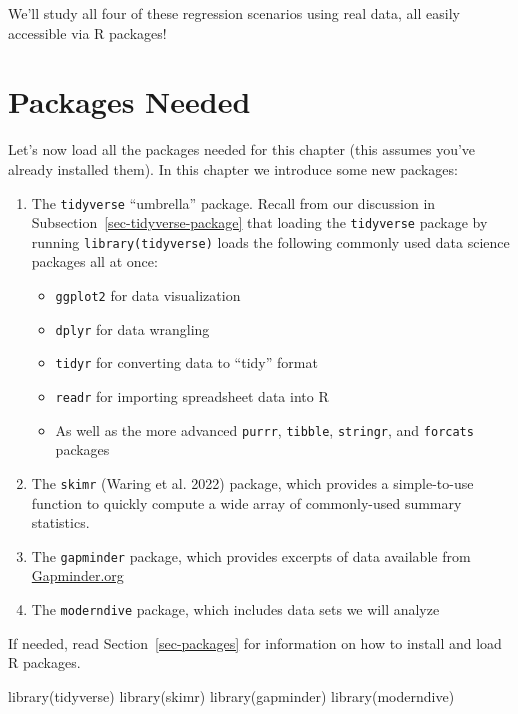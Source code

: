 \documentclass[
  letterpaper,
  DIV=11,
  numbers=noendperiod]{scrreprt}
\newenvironment{Shaded}{\begin{snugshade}}{\end{snugshade}}
\newcommand{\FunctionTok}[1]{\textcolor[rgb]{0.28,0.35,0.67}{#1}}
\newcommand{\NormalTok}[1]{\textcolor[rgb]{0.00,0.23,0.31}{#1}}
\providecommand{\tightlist}{%
  \setlength{\itemsep}{0pt}\setlength{\parskip}{0pt}}\usepackage{longtable,booktabs,array}
\theoremstyle{definition}
\theoremstyle{remark}
\begin{document}
We'll study all four of these regression scenarios using real data, all
easily accessible via R packages!

\hypertarget{packages-needed-3}{%
\section*{Packages Needed}\label{packages-needed-3}}

Let's now load all the packages needed for this chapter (this assumes
you've already installed them). In this chapter we introduce some new
packages:

\begin{enumerate}
\def\labelenumi{\arabic{enumi}.}
\item
  The \texttt{tidyverse} ``umbrella'' package. Recall from our
  discussion in Subsection~\ref{sec-tidyverse-package} that loading the
  \texttt{tidyverse} package by running \texttt{library(tidyverse)}
  loads the following commonly used data science packages all at once:

  \begin{itemize}
  \tightlist
  \item
    \texttt{ggplot2} for data visualization
  \item
    \texttt{dplyr} for data wrangling
  \item
    \texttt{tidyr} for converting data to ``tidy'' format
  \item
    \texttt{readr} for importing spreadsheet data into R
  \item
    As well as the more advanced \texttt{purrr}, \texttt{tibble},
    \texttt{stringr}, and \texttt{forcats} packages
  \end{itemize}
\item
  The \texttt{skimr} (Waring et al. 2022) package, which provides a
  simple-to-use function to quickly compute a wide array of
  commonly-used summary statistics.
\item
  The \texttt{gapminder} package, which provides excerpts of data
  available from \href{https://gapminder.org}{Gapminder.org}
\item
  The \texttt{moderndive} package, which includes data sets we will
  analyze
\end{enumerate}

If needed, read Section~\ref{sec-packages} for information on how to
install and load R packages.

\begin{Shaded}
\begin{Highlighting}[]
\FunctionTok{library}\NormalTok{(tidyverse)}
\FunctionTok{library}\NormalTok{(skimr)}
\FunctionTok{library}\NormalTok{(gapminder)}
\FunctionTok{library}\NormalTok{(moderndive)}
\end{Highlighting}
\end{Shaded}
\end{document}
